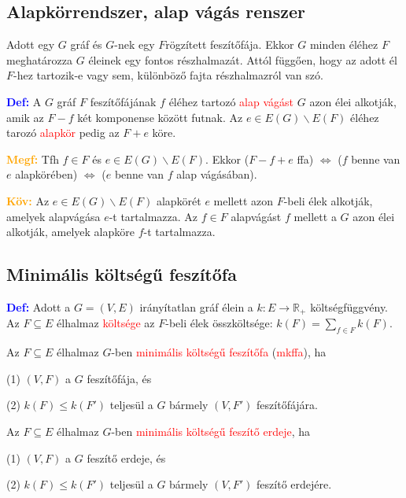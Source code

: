 \documentclass[../szamtud.tex]{subfiles}
\begin{document}
    \subsection{Alapkörrendszer, alap vágás renszer}

        Adott egy $G$ gráf és $G$-nek egy $F$rögzített feszítőfája. Ekkor $G$ minden éléhez $F$ meghatározza $G$ éleinek egy fontos részhalmazát. Attól függően, hogy az adott él $F$-hez tartozik-e vagy sem, különböző fajta részhalmazról van szó.

        \textcolor{blue}{\textbf{Def:}} A $G$ gráf $F$ feszítőfájának $f$ éléhez tartozó \textcolor{red}{alap vágást} $G$ azon élei alkotják, amik az $F-f$ két komponense között futnak. Az $e \in E(G) \backslash E(F)$ éléhez tarozó \textcolor{red}{alapkör} pedig az $F+e$ köre.

        \textcolor{orange}{\textbf{Megf:}} Tfh $f \in F$ és $e \in E(G) \backslash E(F)$. Ekkor ($F-f+e$ ffa) $\Longleftrightarrow$ ($f$ benne van $e$ alapkörében) $\Longleftrightarrow$ ($e$ benne van $f$ alap vágásában).

        \textcolor{orange}{\textbf{Köv:}} Az $e \in E(G) \backslash E(F)$ alapkörét $e$ mellett azon $F$-beli élek alkotják, amelyek alapvágása $e$-t tartalmazza. Az $f \in F$ alapvágást $f$ mellett a $G$ azon élei alkotják, amelyek alapköre $f$-t tartalmazza.

    \subsection{Minimális költségű feszítőfa}

        \textcolor{blue}{\textbf{Def:}} Adott a $G = (V,E)$ irányítatlan gráf élein a $k:E \rightarrow \mathbb{R}_+$ költségfüggvény. Az $F \subseteq E$ élhalmaz \textcolor{red}{költsége} az $F$-beli élek összköltsége: $k(F) = \sum_{f\in F}k(F)$.

        Az $F \subseteq E$ élhalmaz $G$-ben \textcolor{red}{minimális költségű feszítőfa} (\textcolor{red}{mkffa}), ha 

        (1) $(V,F)$ a $G$ feszítőfája, és
        
        (2) $k(F) \leq k(F')$ teljesül a $G$ bármely $(V,F')$ feszítőfájára.
        
        Az $F \subseteq E$ élhalmaz $G$-ben \textcolor{red}{minimális költségű feszítő erdeje}, ha 

        (1) $(V,F)$ a $G$ feszítő erdeje, és

        (2) $k(F) \leq k(F')$ teljesül a $G$ bármely $(V,F')$ feszítő erdejére.
\end{document}
